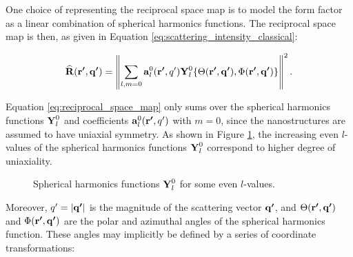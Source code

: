 
One choice of representing the reciprocal space map is to model the form factor as a linear combination of spherical harmonics functions.
The reciprocal space map is then,
as given in Equation \eqref{eq:scattering_intensity_classical}:

\begin{equation}\label{eq:reciprocal_space_map}
    \bm{\mathrm{\widehat{R}}}(\bm{\mathrm{r'}}, \bm{\mathrm{q'}}) = \left\| \sum_{l, m=0} \bm{\mathrm{a}}_{l}^{0}(\bm{\mathrm{r'}}, q') \bm{\mathrm{Y}}_{l}^{0} \{ \Theta(\bm{\mathrm{r'}}, \bm{\mathrm{q'}}), \Phi(\bm{\mathrm{r'}}, \bm{\mathrm{q'}}) \} \right\|^{2}.
\end{equation}

Equation \eqref{eq:reciprocal_space_map} only sums over the spherical harmonics functions $\bm{\mathrm{Y}}_{l}^{0}$ and coefficients $\bm{\mathrm{a}}_{l}^{0}(\bm{\mathrm{r'}}, q')$ with $m=0$, since the nanostructures are assumed to have uniaxial symmetry.
As shown in Figure \ref{fig:spherical_harmonics}, the increasing even $l$-values of the spherical harmonics functions $\bm{\mathrm{Y}}_{l}^{0}$ correspond to higher degree of uniaxiality.

\begin{figure}[h!]
    \centering
    
    
    \caption{Spherical harmonics functions $\bm{\mathrm{Y}}_{l}^{0}$ for some even $l$-values.
    }
    \label{fig:spherical_harmonics}
\end{figure}


Moreover, $q' = |\bm{\mathrm{q'}}|$ is the magnitude of the scattering vector $\bm{\mathrm{q'}}$, and $\Theta(\bm{\mathrm{r'}}, \bm{\mathrm{q'}})$ and $\Phi(\bm{\mathrm{r'}}, \bm{\mathrm{q'}})$ are the polar and azimuthal angles of the spherical harmonics function.
These angles may implicitly be defined by a series of coordinate transformations:


